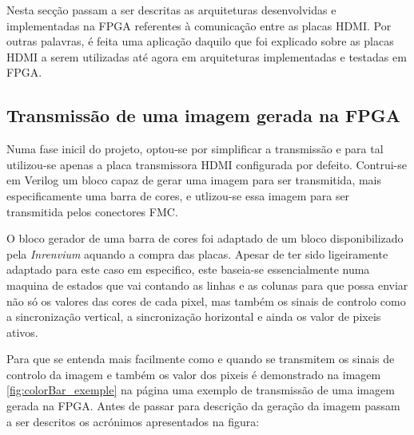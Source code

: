 Nesta secção passam a ser descritas as arquiteturas desenvolvidas e implementadas na FPGA referentes à comunicação entre as placas HDMI.  Por outras palavras, é feita uma aplicação daquilo que foi explicado sobre as placas HDMI a serem utilizadas até agora em arquiteturas implementadas e testadas em FPGA.

\subsection{Transmissão de uma imagem gerada na FPGA} \label{subsub:planA}

Numa fase inicil do projeto, optou-se por simplificar a transmissão e para tal utilizou-se apenas a placa transmissora HDMI configurada por defeito. Contrui-se em Verilog um bloco capaz de gerar uma imagem para ser transmitida, mais especificamente uma barra de cores, e utlizou-se essa imagem para ser transmitida pelos conectores FMC.

O bloco gerador de uma barra de cores foi adaptado de um bloco disponibilizado pela \textit{Inrenvium} aquando a compra das placas. Apesar de ter sido ligeiramente adaptado para este caso em especifico, este baseia-se essencialmente numa maquina de estados que vai contando as linhas e as colunas para que possa enviar não só os valores das cores de cada pixel, mas também os sinais de controlo como a sincronização vertical, a sincronização horizontal e ainda os valor de pixeis ativos.

Para que se entenda mais facilmente como e quando se transmitem os sinais de controlo da imagem e também os valor dos pixeis é demonstrado na imagem \ref{fig:colorBar_exemple} na página \pageref{fig:colorBar_exemple} uma exemplo de transmissão de uma imagem gerada na FPGA. Antes de passar para descrição da geração da imagem passam a ser descritos os acrónimos apresentados na figura:

